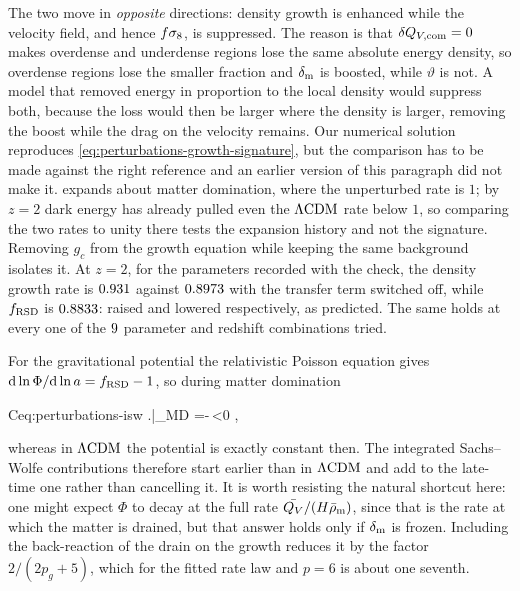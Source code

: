 The two move in \emph{opposite} directions: density growth is enhanced while
the velocity field, and hence $f\sigma_{8}$, is suppressed. The reason is that
$\delta Q_{V,\rm com}=0$ makes overdense and underdense regions lose the same
absolute energy density, so overdense regions lose the smaller fraction and
$\delta_{\rm m}$ is boosted, while $\vartheta$ is not. A model that removed
energy in proportion to the local density would suppress both, because the loss
would then be larger where the density is larger, removing the boost while the
drag on the velocity remains. Our numerical solution reproduces
\cref{eq:perturbations-growth-signature}, but the comparison has to be made
against the right reference and an earlier version of this paragraph did not
make it.  expands about matter
domination, where the unperturbed rate is $1$; by $z=2$ dark energy has already
pulled even the $\Lambda\mathrm{CDM}$ rate below $1$, so comparing the two rates to unity
there tests the expansion history and not the signature. Removing $g_c$ from
the growth equation while keeping the same background isolates it. At $z=2$,
for the parameters recorded with the check, the density growth rate is
$0.931$ against
$0.8973$ with the transfer term switched
off, while $f_{\rm RSD}$ is $0.8833$: raised and lowered
respectively, as predicted. The same holds at every one of the
$9$ parameter and redshift combinations
tried.

For the gravitational potential the relativistic Poisson equation gives
$\mathrm{d}\ln\Phi/\mathrm{d}\ln a=f_{\rm RSD}-1$, so during matter domination
%
\begin{keyresult}{C}{eq:perturbations-isw}
  \left.\right|_{\rm MD}
  =-\,<0 ,
\end{keyresult}
%
whereas in $\Lambda\mathrm{CDM}$ the potential is exactly constant then. The integrated
Sachs--Wolfe contributions therefore start earlier than in $\Lambda\mathrm{CDM}$ and add to
the late-time one rather than cancelling it. It is worth resisting the natural
shortcut here: one might expect $\Phi$ to decay at the full rate
$\bar {Q_{V}}/(H\bar\rho_{\rm m})$, since that is the rate at which the matter
is drained, but that answer holds only if $\delta_{\rm m}$ is frozen. Including
the back-reaction of the drain on the growth reduces it by the factor
$2/(2p_g+5)$, which for the fitted rate law and $p=6$ is about one
seventh.

